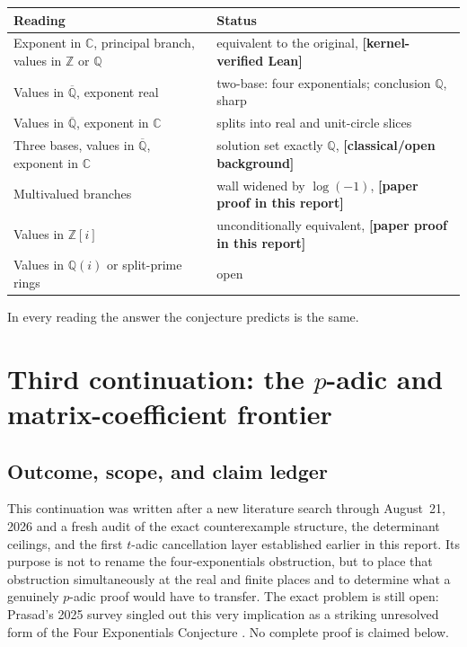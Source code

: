 \documentclass[11pt,oneside]{article}
\theoremstyle{definition}
\theoremstyle{remark}
\newcommand{\Z}{\mathbb Z}
\newcommand{\Q}{\mathbb Q}
\newcommand{\C}{\mathbb C}
\newcommand{\Abar}{\overline{\mathbb Q}}
\newcommand{\Qbar}{\Abar}
\newcommand{\statuslean}{\textcolor{leanblue}{\textbf{[kernel-verified Lean]}}}
\newcommand{\statusnew}{\textcolor{newgreen}{\textbf{[paper proof in this report]}}}
\newcommand{\statusknown}{\textcolor{classicalgray}{\textbf{[classical/open background]}}}
\begin{document}
\begin{center}
\begin{tabularx}{\textwidth}{@{}>{\raggedright\arraybackslash}p{}X@{}}
\toprule
Reading & Status \\
\midrule
Exponent in $\C$, principal branch, values in $\Z$ or $\Q$ &
equivalent to the original, \statuslean \\
Values in $\Qbar$, exponent real & two-base: four exponentials; conclusion $\Q$, sharp \\
Values in $\Qbar$, exponent in $\C$ & splits into real and unit-circle slices \\
Three bases, values in $\Qbar$, exponent in $\C$ & solution set exactly $\Q$, \statusknown \\
Multivalued branches & wall widened by $\log(-1)$, \statusnew \\
Values in $\Z[i]$ & unconditionally equivalent, \statusnew \\
Values in $\Q(i)$ or split-prime rings & open \\
\bottomrule
\end{tabularx}
\end{center}

In every reading the answer the conjecture predicts is the same.

\clearpage
\section{Third continuation: the \texorpdfstring{$p$}{p}-adic and matrix-coefficient frontier}
\label{sec:continuation3}

\subsection{Outcome, scope, and claim ledger}

This continuation was written after a new literature search through August~21, 2026 and a
fresh audit of the exact counterexample structure, the determinant ceilings, and the first
$t$-adic cancellation layer established earlier in this report.  Its purpose is not to rename
the four-exponentials obstruction, but to place that obstruction simultaneously at the real
and finite places and to determine what a genuinely $p$-adic proof would have to transfer.
The exact problem is still open: Prasad's 2025 survey singled out this very implication as a
striking unresolved form of the Four Exponentials Conjecture
\cite{Prasad2025}.  No complete proof is claimed below.
\end{document}
